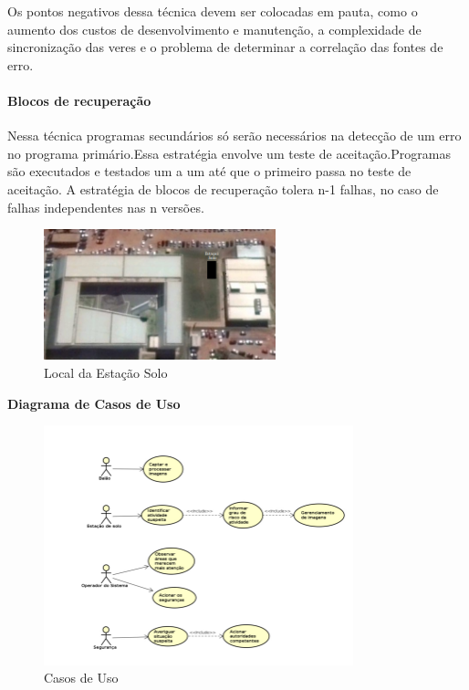 Os pontos negativos dessa técnica devem ser colocadas em pauta, como o aumento dos custos de desenvolvimento e manutenção, a complexidade de sincronização das veres e o problema de determinar a correlação das fontes de erro.

\paragraph{Blocos de recuperação}

Nessa técnica programas secundários só serão necessários na detecção de um erro no programa primário.Essa estratégia envolve um teste de aceitação.Programas são executados e testados um a um até que o primeiro passa no teste de aceitação. A estratégia de blocos de recuperação tolera n-1 falhas, no caso de falhas independentes nas n versões.



\begin{figure}[H]
		\centering
		\includegraphics[width=0.6\textwidth]{figuras/estacaoSolo}
		\caption{Local da Estação Solo}
		\label{img:estacaoSoloLocal}
	\end{figure}
	
\textbf{Diagrama de Casos de Uso}
\begin{figure}[htp]
	\centering
\includegraphics[width=0.80\textwidth]{figuras/Casosdeuso}
\caption{Casos de Uso}
\label{Casos de Uso}
\end{figure}
\\


